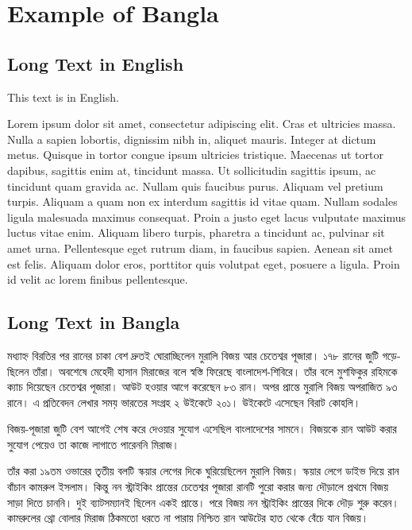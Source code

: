 \chapter{Example of Bangla}

\section{Long Text in English}

This text is in English.


Lorem ipsum dolor sit amet, consectetur adipiscing elit. Cras et
ultricies massa. Nulla a sapien lobortis, dignissim nibh in, aliquet
mauris. Integer at dictum metus. Quisque in tortor congue ipsum
ultricies tristique. Maecenas ut tortor dapibus, sagittis enim at,
tincidunt massa. Ut sollicitudin sagittis ipsum, ac tincidunt quam
gravida ac. Nullam quis faucibus purus. Aliquam vel pretium
turpis. Aliquam a quam non ex interdum sagittis id vitae quam. Nullam
sodales ligula malesuada maximus consequat. Proin a justo eget lacus
vulputate maximus luctus vitae enim. Aliquam libero turpis, pharetra a
tincidunt ac, pulvinar sit amet urna. Pellentesque eget rutrum diam,
in faucibus sapien. Aenean sit amet est felis. Aliquam dolor eros,
porttitor quis volutpat eget, posuere a ligula. Proin id velit ac
lorem finibus pellentesque.

\section{Long Text in Bangla}

\begin{bengali}
  মধ্যাহ্ন বিরতির পর রানের চাকা বেশ দ্রুতই ঘোরাচ্ছিলেন মুরালি বিজয় আর
  চেতেশ্বর পূজারা। ১৭৮ রানের জুটি গড়েছিলেন তাঁরা। অবশেষে মেহেদী হাসান
  মিরাজের বলে স্বস্তি ফিরেছে বাংলাদেশ-শিবিরে। তাঁর বলে মুশফিকুর রহিমকে ক্যাচ
  দিয়েছেন চেতেশ্বর পূজারা। আউট হওয়ার আগে করেছেন ৮৩ রান। অপর প্রান্তে মুরালি
  বিজয় অপরাজিত ৯৩ রানে। এ প্রতিবেদন লেখার সময় ভারতের সংগ্রহ ২ উইকেটে
  ২০১। উইকেটে এসেছেন বিরাট কোহলি।

  বিজয়-পূজারা জুটি বেশ আগেই শেষ করে দেওয়ার সুযোগ এসেছিল বাংলাদেশের সামনে।
  বিজয়কে রান আউট করার সুযোগ পেয়েও তা কাজে লাগাতে পারেননি মিরাজ।

  তাঁর করা ১৯তম ওভারের তৃতীয় বলটি স্কয়ার লেগের দিকে ঘুরিয়েছিলেন মুরালি
  বিজয়। স্কয়ার লেগে ডাইভ দিয়ে রান বাঁচান কামরুল ইসলাম। কিন্তু নন স্ট্রাইকিং
  প্রান্তের চেতেশ্বর পূজারা রানটি পুরো করার জন্য দৌড়ালে প্রথমে বিজয় সাড়া দিতে
  চাননি। দুই ব্যাটসম্যানই ছিলেন একই প্রান্তে। পরে বিজয় নন স্ট্রাইকিং প্রান্তের
  দিকে দৌড় শুরু করেন। কামরুলের থ্রো বোলার মিরাজ ঠিকমতো ধরতে না পারায়
  নিশ্চিত রান আউটের হাত থেকে বেঁচে যান বিজয়।
\end{bengali}
